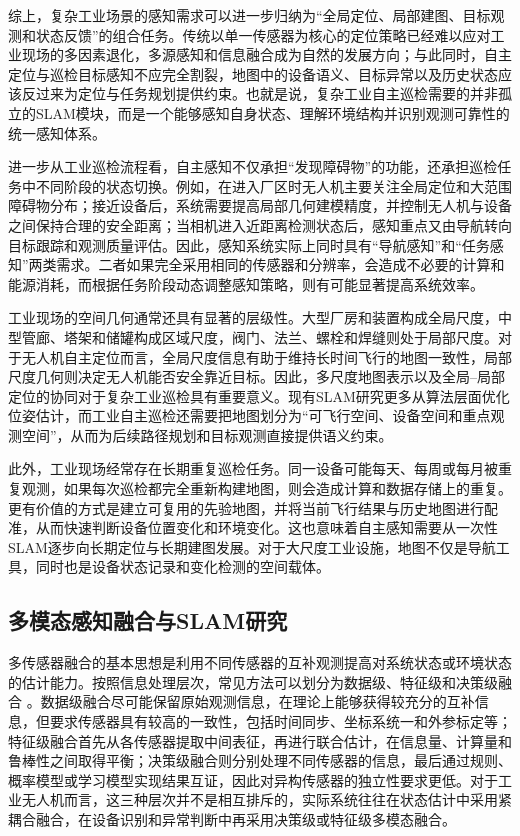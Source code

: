 综上，复杂工业场景的感知需求可以进一步归纳为“全局定位、局部建图、目标观测和状态反馈”的组合任务。传统以单一传感器为核心的定位策略已经难以应对工业现场的多因素退化，多源感知和信息融合成为自然的发展方向；与此同时，自主定位与巡检目标感知不应完全割裂，地图中的设备语义、目标异常以及历史状态应该反过来为定位与任务规划提供约束。也就是说，复杂工业自主巡检需要的并非孤立的SLAM模块，而是一个能够感知自身状态、理解环境结构并识别观测可靠性的统一感知体系。



进一步从工业巡检流程看，自主感知不仅承担“发现障碍物”的功能，还承担巡检任务中不同阶段的状态切换。例如，在进入厂区时无人机主要关注全局定位和大范围障碍物分布；接近设备后，系统需要提高局部几何建模精度，并控制无人机与设备之间保持合理的安全距离；当相机进入近距离检测状态后，感知重点又由导航转向目标跟踪和观测质量评估。因此，感知系统实际上同时具有“导航感知”和“任务感知”两类需求。二者如果完全采用相同的传感器和分辨率，会造成不必要的计算和能源消耗，而根据任务阶段动态调整感知策略，则有可能显著提高系统效率。

工业现场的空间几何通常还具有显著的层级性。大型厂房和装置构成全局尺度，中型管廊、塔架和储罐构成区域尺度，阀门、法兰、螺栓和焊缝则处于局部尺度。对于无人机自主定位而言，全局尺度信息有助于维持长时间飞行的地图一致性，局部尺度几何则决定无人机能否安全靠近目标。因此，多尺度地图表示以及全局--局部定位的协同对于复杂工业巡检具有重要意义。现有SLAM研究更多从算法层面优化位姿估计，而工业自主巡检还需要把地图划分为“可飞行空间、设备空间和重点观测空间”，从而为后续路径规划和目标观测直接提供语义约束。

此外，工业现场经常存在长期重复巡检任务。同一设备可能每天、每周或每月被重复观测，如果每次巡检都完全重新构建地图，则会造成计算和数据存储上的重复。更有价值的方式是建立可复用的先验地图，并将当前飞行结果与历史地图进行配准，从而快速判断设备位置变化和环境变化。这也意味着自主感知需要从一次性SLAM逐步向长期定位与长期建图发展。对于大尺度工业设施，地图不仅是导航工具，同时也是设备状态记录和变化检测的空间载体。

\subsection{多模态感知融合与SLAM研究}

多传感器融合的基本思想是利用不同传感器的互补观测提高对系统状态或环境状态的估计能力。按照信息处理层次，常见方法可以划分为数据级、特征级和决策级融合
\cite{panq2003basic,wangj2004survey,hey2000multi}。数据级融合尽可能保留原始观测信息，在理论上能够获得较充分的互补信息，但要求传感器具有较高的一致性，包括时间同步、坐标系统一和外参标定等；特征级融合首先从各传感器提取中间表征，再进行联合估计，在信息量、计算量和鲁棒性之间取得平衡；决策级融合则分别处理不同传感器的信息，最后通过规则、概率模型或学习模型实现结果互证，因此对异构传感器的独立性要求更低。对于工业无人机而言，这三种层次并不是相互排斥的，实际系统往往在状态估计中采用紧耦合融合，在设备识别和异常判断中再采用决策级或特征级多模态融合。


